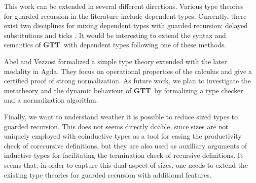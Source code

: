 \documentclass[a4paper,UKenglish,cleveref, autoref,numberwithinsect]{lipics-v2019}
\newcommand{\remove}[1]{}
\newcommand{\GTT}{\textbf{GTT}}
\begin{document}
This work can be extended in several different directions.
Various type theories for guarded recursion in the literature include
dependent types. Currently, there exist two disciplines for mixing
dependent types with guarded recursion: delayed substitutions
\cite{bizjak2016guarded} and ticks \cite{BahrGM17}. It would be interesting to extend
the syntax and semantics of \GTT\ with dependent types following one
of these methods.

Abel and Vezzosi \cite{AbelV14} formalized a simple type theory
extended with the later modality in Agda. They focus on operational
properties of the calculus and give a certified proof of strong
normalization. As future work, we plan to investigate the metatheory
and the dynamic behaviour of \GTT\ by formalizing a  type
checker and a normalization algorithm.



\remove{
and weakening, and we constructed denotational semantics for it in type theory extended with sized types.
From this, we concluded that this theory is consistent and that guarded recursion can be defined via sized types.

There are several possible ways to improve on this result.
First of all, one could define a dependent version of this type theory extended with multiple clocks.
This can be done in two ways.
Either one extends the object theory with delayed substitutions \cite{bizjak2016guarded} or with ticks \cite{BahrGM17}.
Second of all, with the deep embedding in place, one can further study the meta-theory by defining a formalized type checking and a normalization algorithm.
}

Finally, we want to understand weather it is possible to reduce sized
types to guarded recursion.  This does not seems directly doable,
since sizes are not uniquely employed with coinductive types as a tool
for easing the productivity check of corecursive definitions, but they
are also used as auxiliary arguments of inductive types for
facilitating the termination check of recursive definitions. It seems
that, in order to capture this dual aspect of sizes, one needs to
extend the existing type theories for guarded recursion with
additional features.



\end{document}
